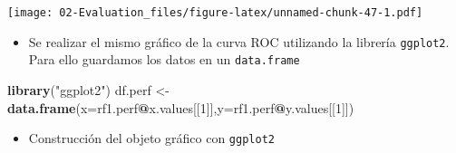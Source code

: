 \documentclass[]{book}
\newenvironment{Shaded}{\begin{snugshade}}{\end{snugshade}}
\newcommand{\DataTypeTok}[1]{\textcolor[rgb]{0.13,0.29,0.53}{#1}}
\newcommand{\DecValTok}[1]{\textcolor[rgb]{0.00,0.00,0.81}{#1}}
\newcommand{\KeywordTok}[1]{\textcolor[rgb]{0.13,0.29,0.53}{\textbf{#1}}}
\newcommand{\NormalTok}[1]{#1}
\newcommand{\OperatorTok}[1]{\textcolor[rgb]{0.81,0.36,0.00}{\textbf{#1}}}
\newcommand{\StringTok}[1]{\textcolor[rgb]{0.31,0.60,0.02}{#1}}
\providecommand{\tightlist}{%
  \setlength{\itemsep}{0pt}\setlength{\parskip}{0pt}}
\begin{document}
\texttt{[image: 02-Evaluation\_files/figure-latex/unnamed-chunk-47-1.pdf]}

\begin{itemize}
\tightlist
\item
  Se realizar el mismo gráfico de la curva ROC utilizando la librería \texttt{ggplot2}. Para ello guardamos los datos en un \texttt{data.frame}
\end{itemize}

\begin{Shaded}
\begin{Highlighting}[]
\KeywordTok{library}\NormalTok{(}\StringTok{"ggplot2"}\NormalTok{)}
\NormalTok{df.perf <-}\StringTok{ }\KeywordTok{data.frame}\NormalTok{(}\DataTypeTok{x=}\NormalTok{rf1.perf}\OperatorTok{@}\NormalTok{x.values[[}\DecValTok{1}\NormalTok{]],}\DataTypeTok{y=}\NormalTok{rf1.perf}\OperatorTok{@}\NormalTok{y.values[[}\DecValTok{1}\NormalTok{]])}
\end{Highlighting}
\end{Shaded}

\begin{itemize}
\tightlist
\item
  Construcción del objeto gráfico con \texttt{ggplot2}
\end{itemize}
\end{document}

